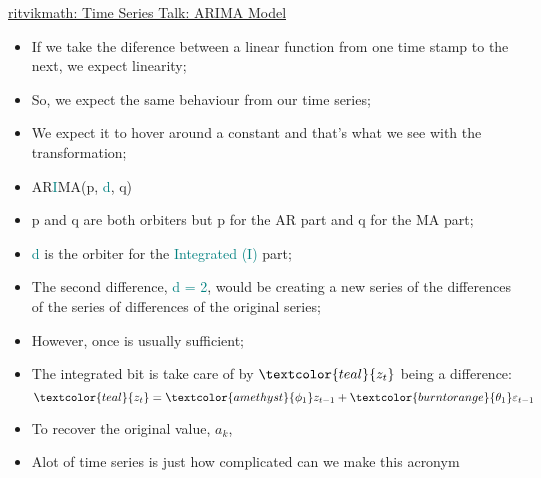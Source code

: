 \documentclass[12pt, titlepage, french]{report}
\begin{document}
\begin{YTB_SUMM}{\href{https://www.youtube.com/watch?v=3UmyHed0iYE&list=PLvcbYUQ5t0UHOLnBzl46_Q6QKtFgfMGc3&index=9}{ritvikmath: Time Series Talk: ARIMA Model}}
\begin{itemize}
	\texttt{[image: src/ritvikmath-anchors-plot-diff.png]}
	\item	If we take the diference between a linear function from one time stamp to the next, we expect linearity;
	\item[]	So, we expect the same behaviour from our time series;
	\item[]	We expect it to hover around a constant and that's what we see with the transformation;
\end{itemize}
\begin{itemize}
	\item	\textcolor{amethyst}{AR}\textcolor{teal}{I}\textcolor{burntorange}{MA}(\textcolor{amethyst}{p}, \textcolor{teal}{d}, \textcolor{burntorange}{q})
	\item[]	\textcolor{amethyst}{p} and \textcolor{burntorange}{q} are both orbiters but \textcolor{amethyst}{p} for the \textcolor{amethyst}{AR} part and \textcolor{burntorange}{q} for the \textcolor{burntorange}{MA} part;
	\item[]	\textcolor{teal}{d} is the orbiter for the \textcolor{teal}{Integrated (I)} part;
	\item	The second difference, \textcolor{teal}{d = 2}, would be creating a new series of the differences of the series of differences of the original series;
	\item[]	However, once is usually sufficient;
	\item	The integrated bit is take care of by $\textcolor{teal}{z_{t}}$ being a difference:
	\begin{equation*}
		\textcolor{teal}{z_{t}}	=	\textcolor{amethyst}{\phi_{1}} z_{t - 1} + \textcolor{burntorange}{\theta_{1}} \varepsilon_{t - 1}
	\end{equation*}	
	\item	To recover the original value, $a_{k}$, 
	\item	Alot of time series is just how complicated can we make this acronym
\end{itemize}
\end{YTB_SUMM}
\end{document}

